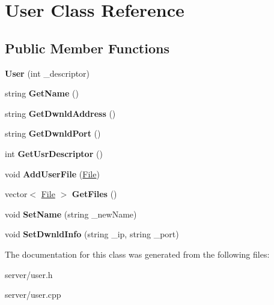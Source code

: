\hypertarget{class_user}{}\section{User Class Reference}
\label{class_user}
\subsection*{Public Member Functions}
\begin{DoxyCompactItemize}
\item 
\mbox{\label{class_user_ae6a33d0284ee07f104ff7d05c6271e6d}} 
{\bfseries User} (int \+\_\+descriptor)
\item 
\mbox{\label{class_user_ab0f591a190de561ad4bbe279f82de4b1}} 
string {\bfseries Get\+Name} ()
\item 
\mbox{\label{class_user_a8568b6478b10afccc4d7ebc4873134da}} 
string {\bfseries Get\+Dwnld\+Address} ()
\item 
\mbox{\label{class_user_afdb7c6b57252e3ad038cf41001beff55}} 
string {\bfseries Get\+Dwnld\+Port} ()
\item 
\mbox{\label{class_user_a5befaded3204a579516eb710c79b2a78}} 
int {\bfseries Get\+Usr\+Descriptor} ()
\item 
\mbox{\label{class_user_a09281e088a33ff69575ecb32ce982df2}} 
void {\bfseries Add\+User\+File} (\mbox{\hyperlink{class_file}{File}})
\item 
\mbox{\label{class_user_a0682212d631f5be2e9021b515f53ab46}} 
vector$<$ \mbox{\hyperlink{class_file}{File}} $>$ {\bfseries Get\+Files} ()
\item 
\mbox{\label{class_user_a58ff5727a81dbcea5cc50bd947d7a842}} 
void {\bfseries Set\+Name} (string \+\_\+new\+Name)
\item 
\mbox{\label{class_user_ae2bed2c711a835679d465c972d9174cf}} 
void {\bfseries Set\+Dwnld\+Info} (string \+\_\+ip, string \+\_\+port)
\end{DoxyCompactItemize}


The documentation for this class was generated from the following files\+:\begin{DoxyCompactItemize}
\item 
server/user.\+h\item 
server/user.\+cpp\end{DoxyCompactItemize}
